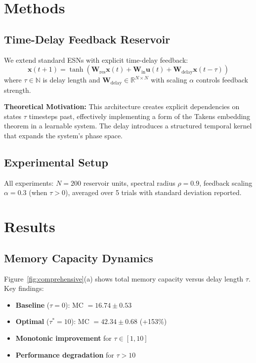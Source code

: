 \documentclass[11pt]{article}
\begin{document}
\section{Methods}

\subsection{Time-Delay Feedback Reservoir}

We extend standard ESNs with explicit time-delay feedback:
\begin{equation}
\mathbf{x}(t+1) = \tanh(\mathbf{W}_{\text{res}}\mathbf{x}(t) + \mathbf{W}_{\text{in}}\mathbf{u}(t) + \mathbf{W}_{\text{delay}}\mathbf{x}(t-\tau))
\label{eq:tdrc}
\end{equation}
where $\tau \in \mathbb{N}$ is delay length and $\mathbf{W}_{\text{delay}} \in \mathbb{R}^{N \times N}$ with scaling $\alpha$ controls feedback strength.

\textbf{Theoretical Motivation:} This architecture creates explicit dependencies on states $\tau$ timesteps past, effectively implementing a form of the Takens embedding theorem in a learnable system. The delay introduces a structured temporal kernel that expands the system's phase space.

\subsection{Experimental Setup}

All experiments: $N=200$ reservoir units, spectral radius $\rho=0.9$, feedback scaling $\alpha=0.3$ (when $\tau > 0$), averaged over 5 trials with standard deviation reported.

\section{Results}

\subsection{Memory Capacity Dynamics}

Figure~\ref{fig:comprehensive}(a) shows total memory capacity versus delay length $\tau$. Key findings:
\begin{itemize}
\item \textbf{Baseline} ($\tau=0$): MC $= 16.74 \pm 0.53$
\item \textbf{Optimal} ($\tau^*=10$): MC $= 42.34 \pm 0.68$ (+153\%)
\item \textbf{Monotonic improvement} for $\tau \in [1, 10]$
\item \textbf{Performance degradation} for $\tau > 10$
\end{itemize}
\end{document}
